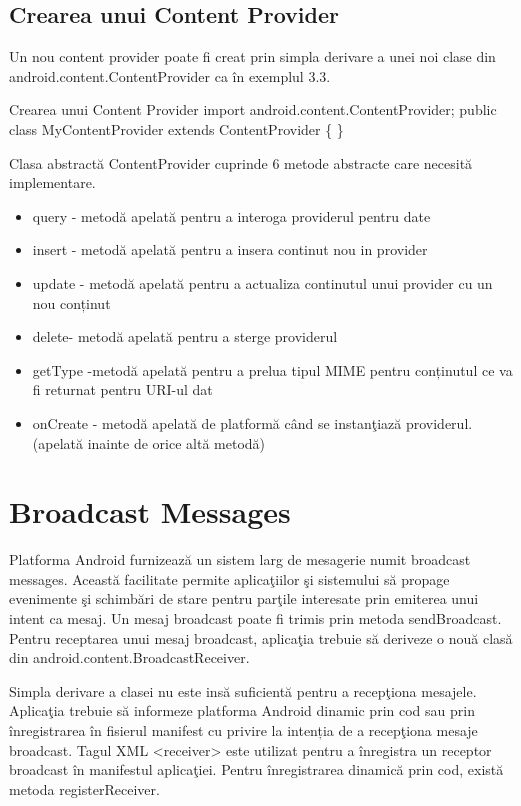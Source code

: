 \subsection{Crearea unui Content Provider}
Un nou content provider poate fi creat prin simpla derivare a unei noi clase din android.content.ContentProvider ca \^in exemplul 3.3.\newline 
\begin{exmp} Crearea unui Content Provider 
import android.content.ContentProvider;\newline 
public class MyContentProvider extends ContentProvider \{\newline 
\}\end{exmp}

Clasa abstract\u a ContentProvider cuprinde 6 metode abstracte care necesită implementare.\cite{2}

\begin{itemize}
  \item query - metodă apelat\u a pentru a interoga providerul pentru date 
  \item insert - metodă apelat\u a pentru a insera continut nou in provider
	\item update - metodă apelat\u a pentru a actualiza continutul unui provider cu un nou conținut
	\item delete-  metodă  apelat\u a pentru a sterge providerul
	\item getType -metodă apelat\u a pentru a prelua tipul MIME pentru conținutul ce va fi returnat pentru URI-ul dat
	\item onCreate - metodă apelat\u a de platform\u a c\^and se instan\c tiaz\u a providerul.(apelat\u a inainte de orice altă metod\u a)
\end{itemize}
\newpage
\section{Broadcast Messages}
Platforma Android furnizeaz\u a un sistem larg de mesagerie numit broadcast messages. Aceast\u a facilitate permite aplica\c tiilor \c si sistemului s\u a propage evenimente \c si schimb\u ari de stare pentru par\c tile interesate prin emiterea unui intent ca mesaj.\newline 
Un mesaj broadcast poate fi trimis prin metoda sendBroadcast. \newline 
Pentru receptarea unui mesaj broadcast, aplica\c tia trebuie s\u a deriveze o nou\u a clas\u a din android.content.BroadcastReceiver. \newline 

Simpla derivare a clasei nu este ins\u a suficientă pentru a recep\c tiona mesajele. Aplica\c tia trebuie s\u a informeze platforma Android dinamic prin cod sau prin \^inregistrarea \^in fisierul manifest cu privire la intenția de a recep\c tiona mesaje broadcast.\newline
Tagul XML <receiver> este utilizat pentru a \^inregistra un receptor broadcast \^in manifestul aplica\c tiei.\newline
Pentru \^inregistrarea dinamic\u a prin cod, exist\u a metoda registerReceiver.\cite{1}\newline
